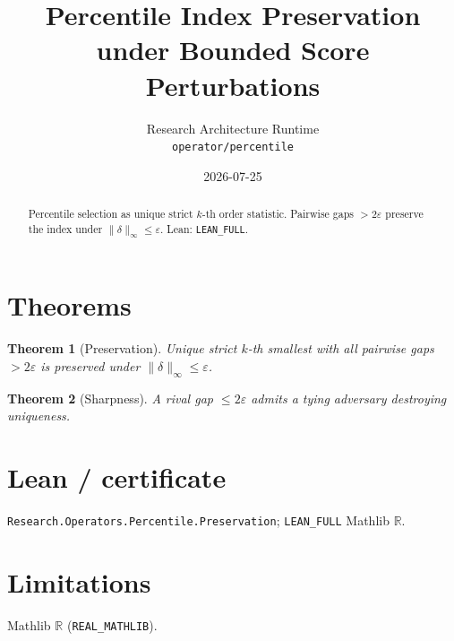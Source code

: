\documentclass[11pt]{article}
\title{Percentile Index Preservation under Bounded Score Perturbations}
\author{Research Architecture Runtime \\ \texttt{operator/percentile}}
\date{2026-07-25}
\newtheorem{theorem}{Theorem}
\begin{document}
\maketitle
\begin{abstract}
Percentile selection as unique strict $k$-th order statistic. Pairwise gaps $>2\varepsilon$
preserve the index under $\|\delta\|_\infty\le\varepsilon$. Lean: \texttt{LEAN\_FULL}.
\end{abstract}
\section{Theorems}
\begin{theorem}[Preservation]
Unique strict $k$-th smallest with all pairwise gaps $>2\varepsilon$ is preserved under
$\|\delta\|_\infty\le\varepsilon$.
\end{theorem}
\begin{theorem}[Sharpness]
A rival gap $\le 2\varepsilon$ admits a tying adversary destroying uniqueness.
\end{theorem}
\section{Lean / certificate}
\texttt{Research.Operators.Percentile.Preservation}; \texttt{LEAN\_FULL} Mathlib $\mathbb{R}$.
\section{Limitations}
Mathlib $\mathbb{R}$ (\texttt{REAL\_MATHLIB}).
\end{document}
